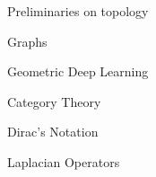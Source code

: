 \documentclass[12pt,a4paper,twoside]{report}
\theoremstyle{plain}
\theoremstyle{definition}
\theoremstyle{remark}
\begin{document}
    \begin{chapter}{Preliminaries on topology}
        \label{ch:1}
        
    \end{chapter}
    \begin{chapter}{Graphs}
        \label{ch:2}
        
    \end{chapter}
    \begin{chapter}{Geometric Deep Learning}
        \label{ch:3}      
        
    \end{chapter}
    \newpage
    \begin{appendices}
        \begin{chapter}{Category Theory}
            \label{app:A}
            
        \end{chapter}
        \begin{chapter}{Dirac's Notation}
            \label{app:B}
            
        \end{chapter}
        \begin{chapter}{Laplacian Operators}
            \label{app:C}
            
        \end{chapter}
    \end{appendices}
    \newpage
    \printbibliography[heading = bibintoc]
\end{document}
